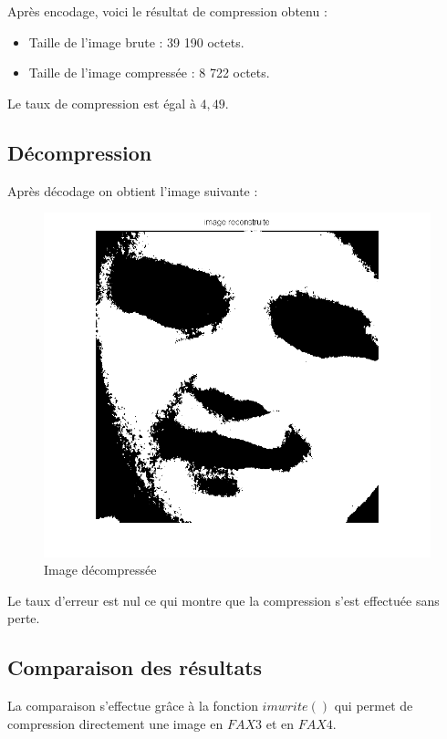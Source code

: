 \documentclass[11pt]{article}
\begin{document}
  Après encodage, voici le résultat de compression obtenu :\\
  \begin{itemize}
  	\item Taille de l'image brute : 39 190 octets.
  	\item Taille de l'image compressée : 8 722 octets.
  \end{itemize}
  Le taux de compression est égal à $4,49$.
  
  \newpage
  \subsection{Décompression}
  
  Après décodage on obtient l'image suivante :

  	\begin{figure}[H]
  	  \centering
  	  \includegraphics[scale=0.6]{img/img_dec.png}
  	  \caption{Image décompressée}
  	  \label{img2}
  	\end{figure}
  	
  	Le taux d'erreur est nul ce qui montre que la compression s'est effectuée sans perte.
  
  \subsection{Comparaison des résultats}
  
  La comparaison s'effectue grâce à la fonction $imwrite()$ qui permet de compression directement une image en $FAX3$ et en $FAX4$.
  
\end{document}
